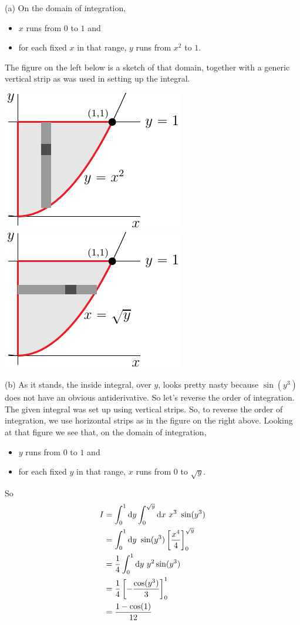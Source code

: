 \begin{solution}
 (a) 
On the domain of integration,
\begin{itemize}
\item
$x$ runs from $0$ to $1$ and
\item 
for each fixed $x$ in that range, $y$ runs from $x^2$ to $1$.
\end{itemize}
The figure on the left below is a sketch of that domain, together with 
a generic vertical strip as was used in setting up the integral.

\begin{center}
     \includegraphics{fig/OE16D_6v.pdf} \qquad
     \includegraphics{fig/OE16D_6h.pdf} 
\end{center}

(b) As it stands, the inside integral, over $y$, looks pretty nasty
because $\sin(y^3)$ does not have an obvious antiderivative. So let's
reverse the order of integration. The given integral was set up 
using vertical strips. So, to reverse the order of integration, we use
horizontal strips as in the figure on the right above. Looking at that
figure we see that, on the domain of integration,
\begin{itemize}
\item
$y$ runs from $0$ to $1$ and
\item 
for each fixed $y$ in that range, $x$ runs from $0$ to $\sqrt{y}$.
\end{itemize}
So
\begin{align*}
I&=\int_0^1\mathrm{d}y \int_0^{\sqrt{y}}\mathrm{d}x\  x^3\ \sin(y^3) \\
 &=\int_0^1\mathrm{d}y\ \sin(y^3)\left[\frac{x^4}{4}\right]_0^{\sqrt{y}} \\
 &=\frac{1}{4}\int_0^1\mathrm{d}y\ y^2\sin(y^3) \\
 &=\frac{1}{4}\left[-\frac{\cos(y^3)}{3}\right]_0^1 \\
 &=\frac{1-\cos(1)}{12}
\end{align*}
\end{solution}

